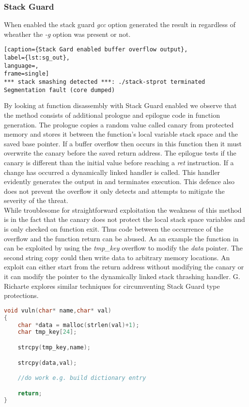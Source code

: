 \subsubsection {Stack Guard}
When enabled the stack guard \emph{gcc} option generated the result in  regardless of wheather the \emph{-g} option was present or not.
\begin{lstlisting}[caption={Stack Gard enabled buffer overflow output},
label={lst:sg_out},
language=,
frame=single]
*** stack smashing detected ***: ./stack-stprot terminated
Segmentation fault (core dumped)
\end{lstlisting}
By looking at function disassembly with Stack Guard enabled we observe that the method consists of additional prologue and epilogue code in function generation. The prologue copies a random value called canary from protected memory and stores it between the function's local variable stack space and the saved base pointer. If a buffer overflow then occurs in this function then it must overwrite the canary before the saved return address. The epilogue tests if the canary is different than the initial value before reaching a \emph{ret} instruction. If a change has occurred  a dynamically linked handler is called. This handler evidently generates the output in  and terminates execution. This defence also does not prevent the overflow it only detects and attempts to mitigate the severity of the threat.\\
While troublesome for straightforward exploitation the weakness of this method is in the fact that the canary does not protect the local stack space variables and is only checked on function exit. Thus code between the occurrence of the overflow and the function return can be abused. As an example the function in  can be exploited by using the \emph{tmp\_key} overflow to modify the \emph{data} pointer. The second string copy could then write data to arbitrary memory locations. An exploit can either start from the return address without modifying the canary or it can modify the pointer to the dynamically linked stack thrashing handler. G. Richarte\cite{Stackgua58} explores similar techniques for circumventing Stack Guard type protections.

\begin{lstlisting}[caption={Stack Gard vulnerable function},
label={lst:sg_example},
language=C,
frame=single]
void vuln(char* name,char* val)
{
    char *data = malloc(strlen(val)+1);
    char tmp_key[24];

    strcpy(tmp_key,name);

    strcpy(data,val);

    //do work e.g. build dictionary entry

    return;
}
\end{lstlisting}
